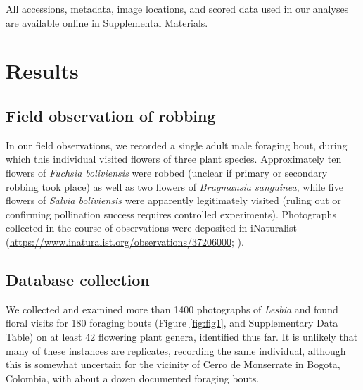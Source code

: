 \documentclass[fleqn,10pt,lineno]{wlpeerj}
\begin{document}
\noindent All accessions, metadata, image locations, and scored data used in our analyses are available online in Supplemental Materials. %
\\

\section*{Results}

\subsection*{Field observation of robbing}
In our field observations, we recorded a single adult male foraging bout, during which this individual visited flowers of three plant species. Approximately ten flowers of \textit{Fuchsia boliviensis} were robbed (unclear if primary or secondary robbing took place) as well as two flowers of \textit{Brugmansia sanguinea}, while five flowers of \textit{Salvia boliviensis} were apparently legitimately visited (ruling out or confirming pollination success requires controlled experiments). 
Photographs collected in the course of observations were deposited in iNaturalist (\href{https://www.inaturalist.org/observations/37206000}{https://www.inaturalist.org/observations/37206000}; \citealt{inaturalist}).

\subsection*{Database collection}
We collected and examined more than 1400 photographs of \textit{Lesbia} and found floral visits for 180 foraging bouts (Figure \ref{fig:fig1}, and Supplementary Data Table) on at least 42 flowering plant genera, identified thus far. %
It is unlikely that many of these instances are replicates, recording the same individual, although this is somewhat uncertain for the vicinity of Cerro de Monserrate in Bogota, Colombia, with about a dozen documented foraging bouts. 
\end{document}
